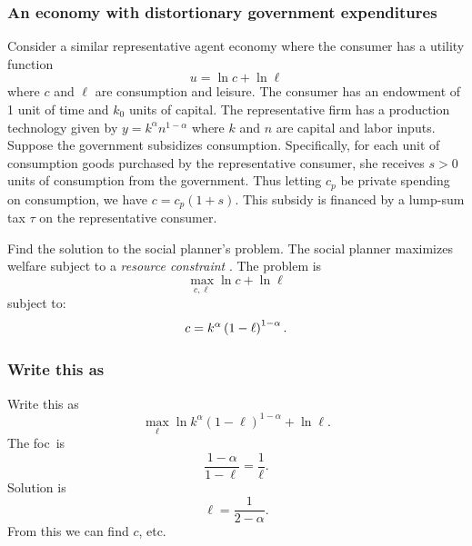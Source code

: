 \documentclass[aspectratio=169]{ltx-talk}
\begin{document}
\begin{frame}
\frametitle{An economy with distortionary government expenditures}
Consider a similar representative agent economy where the consumer has a
utility function 
\begin{equation}
u=\ln c+\ln \ell  \label{u3}
\end{equation}%
where $c$ and $\ell $ are consumption and leisure. The consumer has an
endowment of 1 unit of time and $k_{0}$ units of capital. The representative
firm has a production technology given by $y=k^{\alpha }n^{1-\alpha }$ where 
$k$ and $n$ are capital and labor inputs. Suppose the government subsidizes
consumption. Specifically, for each unit of consumption goods purchased by
the representative consumer, she receives $s>0$ units of consumption from
the government. Thus letting $c_{p}$ be private spending on consumption, we
have $c=c_{p}\left( 1+s\right) .$ This subsidy is financed by a lump-sum tax 
$\tau $ on the representative consumer.

Find the solution to the social planner's problem.\newline
The social planner maximizes welfare subject to a \textit{resource constraint%
}. The problem is 
\begin{equation*}
\underset{c,\ell }{\max }\ln c+\ln \ell
\end{equation*}%
subject to:%
\begin{equation}
c=k^{\alpha }\left( 1-\ell \right) ^{1-\alpha }.  \notag
\end{equation}%
\end{frame}

\begin{frame}
\frametitle{Write this as}
Write this as%
\begin{equation*}
\underset{\ell }{\max }\ln k^{\alpha }\left( 1-\ell \right) ^{1-\alpha }+\ln
\ell .
\end{equation*}%
The foc\ is 
\begin{equation*}
\frac{1-\alpha }{1-\ell }=\frac{1}{\ell }.
\end{equation*}%
Solution is 
\begin{equation*}
\ell =\frac{1}{2-\alpha }.
\end{equation*}%
From this we can find $c$, etc.
\end{frame}
\end{document}
